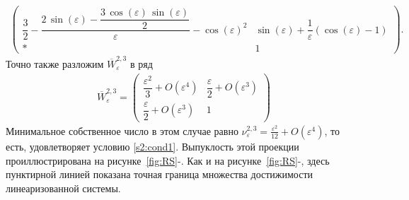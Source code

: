 \documentclass[../main.tex]{subfiles}
\begin{document}
\begin{enumerate}
\begin{gather*}
\begin{pmatrix}
 \dfrac{3}{2}-\dfrac{2\,\sin\left(\varepsilon \right)-\dfrac{3\,\cos\left(\varepsilon \right)\,\sin\left(\varepsilon \right)}{2}}{\varepsilon }-{\cos\left(\varepsilon \right)}^2 & \sin\left(\varepsilon \right)+\dfrac{1}{\varepsilon } \left(\cos\left(\varepsilon \right)-1 \right)\\[8pt]
 * & 
 1 
 \end{pmatrix}.
 \end{gather*}
 Точно также разложим $ \overline{W}_{\varepsilon}^{2,3} $ в ряд
 \begin{gather*}
 \overline{W}_{\varepsilon}^{2,3} = \begin{pmatrix}
 \dfrac{\varepsilon^2}{3} + O(\varepsilon^4) &
 \dfrac{\varepsilon }{2} + O(\varepsilon^3) \\[8pt]
 \dfrac{\varepsilon }{2} + O(\varepsilon^3) & 1
 \end{pmatrix}
 \end{gather*}
 Минимальное собственное число в этом случае равно $ \nu^{2,3}_{\varepsilon} = \frac{\varepsilon^2}{12} + O(\varepsilon^4) $, то есть, удовлетворяет условию \eqref{s2:cond1}. 
Выпуклость этой проекции проиллюстрирована на рисунке~\ref{fig:RS}-. 
Как и на рисунке~\ref{fig:RS}-, здесь пунктирной линией показана точная граница множества достижимости линеаризованной системы.
 \end{enumerate}
\end{document}
